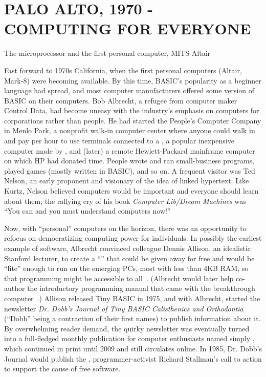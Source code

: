 
\section{PALO ALTO, 1970 - COMPUTING FOR EVERYONE}




\milestone
The microprocessor and the first personal computer, MITS Altair

Fast forward to 1970s California, when the first personal computers (Altair,
Mark-8) were becoming available.  By this time, BASIC's popularity as a
beginner language had spread, and most computer manufacturers offered
some version of BASIC on their computers.
Bob Albrecht, a refugee from computer
maker Control
Data, had become uneasy with the industry's emphasis on computers for
corporations rather than people.  He had
started the People's Computer Company in Menlo Park, a nonprofit walk-in
computer center where anyone could walk in and pay per hour to use
terminals connected to a , a popular inexpensive computer made by
, and (later) a remote Hewlett-Packard
mainframe computer on which 
HP had donated time.  People wrote and ran small-business programs, played games
(mostly written in BASIC), and so on.
A frequent visitor was Ted Nelson, an early proponent and visionary of
the idea of linked hypertext.  Like Kurtz, Nelson believed computers
would be important and everyone should learn about them; the rallying
cry of his book \emph{Computer Lib/Dream Machines} was ``You can and
you must understand computers now!''


\milestone
Now, with ``personal'' computers on the horizon, there was an
opportunity to refocus on democratizing computing power for individuals.
In possibly the earliest example of  software,
Albrecht convinced colleague Dennis Allison, an idealistic Stanford
lecturer, to create a ``'' that could be
given away for free and would be ``lite'' enough to run
on the emerging PCs, most with less than 4KB RAM, so that programming
might be accessible to all~\cite{allison_tiny_basic}.  
(Albrecht would later help co-author the introductory programming manual
that came with the breakthrough 
computer~\cite{commodore}.) 
Allison released Tiny BASIC in 1975, and with Albrecht, started the
newsletter \emph{Dr. Dobb's Journal of Tiny BASIC 
Calisthenics and Orthodontia} (``Dobb'' being a contraction of their
first names)
to publish information about it.
By overwhelming reader demand, the quirky newsletter was eventually
turned into a full-fledged monthly publication for computer enthusiasts
named simply , which continued in print
until 2009 and still circulates online.  In 1985, Dr. Dobb's Journal
would publish the 
, programmer-activist Richard Stallman's call to action
to support the cause of free software.


